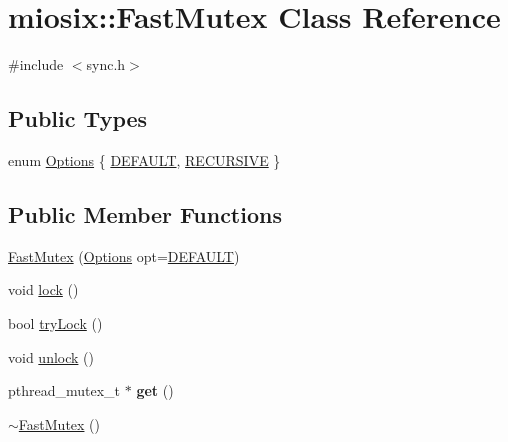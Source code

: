 \hypertarget{classmiosix_1_1_fast_mutex}{\section{miosix\-:\-:Fast\-Mutex Class Reference}
\label{classmiosix_1_1_fast_mutex}
}


{\ttfamily \#include $<$sync.\-h$>$}

\subsection*{Public Types}
\begin{DoxyCompactItemize}
\item 
enum \hyperlink{classmiosix_1_1_fast_mutex_a981dd8f3190f81f16a773b3de6ae0891}{Options} \{ \hyperlink{classmiosix_1_1_fast_mutex_a981dd8f3190f81f16a773b3de6ae0891a3e00b8e92574e595293459333b1e9182}{D\-E\-F\-A\-U\-L\-T}, 
\hyperlink{classmiosix_1_1_fast_mutex_a981dd8f3190f81f16a773b3de6ae0891aa70c27d1982ebadac457d4f1c45fa2c8}{R\-E\-C\-U\-R\-S\-I\-V\-E}
 \}
\end{DoxyCompactItemize}
\subsection*{Public Member Functions}
\begin{DoxyCompactItemize}
\item 
\hyperlink{classmiosix_1_1_fast_mutex_aca5cd49cdb704db34488ac7ef16bbd12}{Fast\-Mutex} (\hyperlink{classmiosix_1_1_fast_mutex_a981dd8f3190f81f16a773b3de6ae0891}{Options} opt=\hyperlink{classmiosix_1_1_fast_mutex_a981dd8f3190f81f16a773b3de6ae0891a3e00b8e92574e595293459333b1e9182}{D\-E\-F\-A\-U\-L\-T})
\item 
void \hyperlink{classmiosix_1_1_fast_mutex_a0ad94f95d78f1316da8b622928b6ff61}{lock} ()
\item 
bool \hyperlink{classmiosix_1_1_fast_mutex_a41f2a4d790a2a7ee8695768d2deae95a}{try\-Lock} ()
\item 
void \hyperlink{classmiosix_1_1_fast_mutex_a080ce00d76c005a73917038908fd824c}{unlock} ()
\item 
\hypertarget{classmiosix_1_1_fast_mutex_a344bddfd8333fe9dacfba56f6ee6c7da}{pthread\-\_\-mutex\-\_\-t $\ast$ {\bfseries get} ()}\label{classmiosix_1_1_fast_mutex_a344bddfd8333fe9dacfba56f6ee6c7da}

\item 
\hyperlink{classmiosix_1_1_fast_mutex_ad320fd1b0d905f2d4fa9e8e0567181d2}{$\sim$\-Fast\-Mutex} ()
\end{DoxyCompactItemize}


